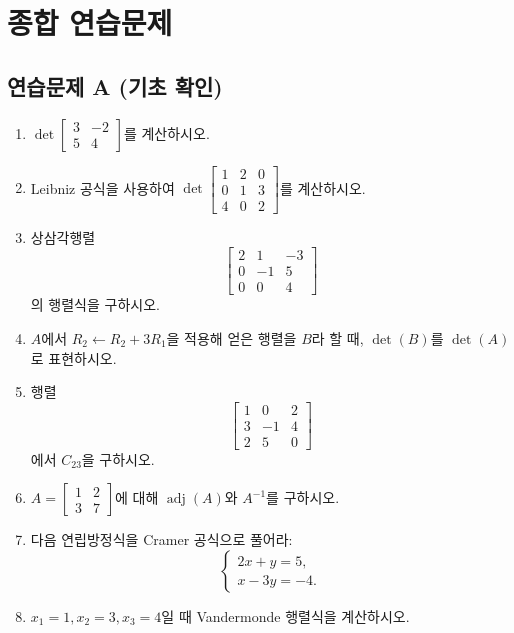 \chaptersummarytemplate

\section*{종합 연습문제}

\subsection*{연습문제 A (기초 확인)}
\begin{enumerate}[label=\textbf{A\arabic*.}]
\item $\det\begin{bmatrix}3&-2\\5&4\end{bmatrix}$를 계산하시오.
\item Leibniz 공식을 사용하여 $\det\begin{bmatrix}1&2&0\\0&1&3\\4&0&2\end{bmatrix}$를 계산하시오.
\item 상삼각행렬
$$
\begin{bmatrix}
2&1&-3\\
0&-1&5\\
0&0&4
\end{bmatrix}
$$
의 행렬식을 구하시오.
\item $A$에서 $R_2\leftarrow R_2+3R_1$을 적용해 얻은 행렬을 $B$라 할 때, $\det(B)$를 $\det(A)$로 표현하시오.
\item 행렬
$$
\begin{bmatrix}
1&0&2\\
3&-1&4\\
2&5&0
\end{bmatrix}
$$
에서 $C_{23}$을 구하시오.
\item $A=\begin{bmatrix}1&2\\3&7\end{bmatrix}$에 대해 $\operatorname{adj}(A)$와 $A^{-1}$를 구하시오.
\item 다음 연립방정식을 Cramer 공식으로 풀어라:
$$
\begin{cases}
2x+y=5,\\
x-3y=-4.
\end{cases}
$$
\item $x_1=1,x_2=3,x_3=4$일 때 Vandermonde 행렬식을 계산하시오.
\end{enumerate}

